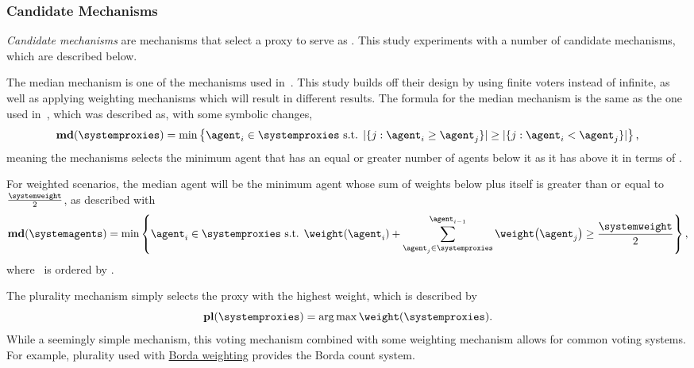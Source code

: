 \subsubsection{Candidate Mechanisms}\label{subsubsec:candidate-mechanisms}
\textit{Candidate mechanisms} are mechanisms that select a proxy to serve as
\systemtruth.
This study experiments with a number of candidate mechanisms, which are
described below.

\label{para:median}
The median mechanism is one of the mechanisms used in~\cite{Cohensius2017}.
This study builds off their design by using finite voters instead of
infinite, as well as applying weighting mechanisms which will result in
different results.
The formula for the median mechanism is the same as the one used
in~\cite[para.~2.4]{Cohensius2017}, which was described as, with some
symbolic changes,
\begin{equation*}
    \textbf{md}(\systemproxies) =
    \min\left\{\agent_i \in \systemproxies \text{ s.t. }
    |\{j: \agent_i \geq \agent_j\}| \geq
    |\{j: \agent_i < \agent_j\}|
    \right\}
    \text{,}
\end{equation*}
meaning the mechanisms selects the minimum agent that has an equal or greater
number of agents below it as it has above it in terms of \agenttruth.

For weighted scenarios, the median agent will be the minimum agent whose sum of
weights below plus itself is greater than or equal to $\frac{\systemweight}{2}$,
as described with
\begin{equation}
    \textbf{md}(\systemagents) = \min\left\{
    \agent_i \in \systemproxies \text{ s.t. }
    \weightof{\agent_i} +
    \sum_{\agent_j \in \systemproxies}^{\agent_{i - 1}} \weightof{\agent_j}
    \geq \frac{\systemweight}{2}
    \right\}
    \text{,}\label{eq:median-mechanism}
\end{equation}
where \systemproxies\ is ordered by \agenttruth.

\label{para:plurality}
The plurality mechanism simply selects the proxy with the highest weight, which
is described by
\begin{equation}
    \textbf{pl}(\systemproxies) =
    \argmax \weightof{\systemproxies}
    \text{.}\label{eq:plurality-mechanism}
\end{equation}
While a seemingly simple mechanism, this voting mechanism combined with some
weighting mechanism allows for common voting systems.
For example, plurality used with \hyperref[para:borda]{Borda weighting}
provides the Borda count system.

